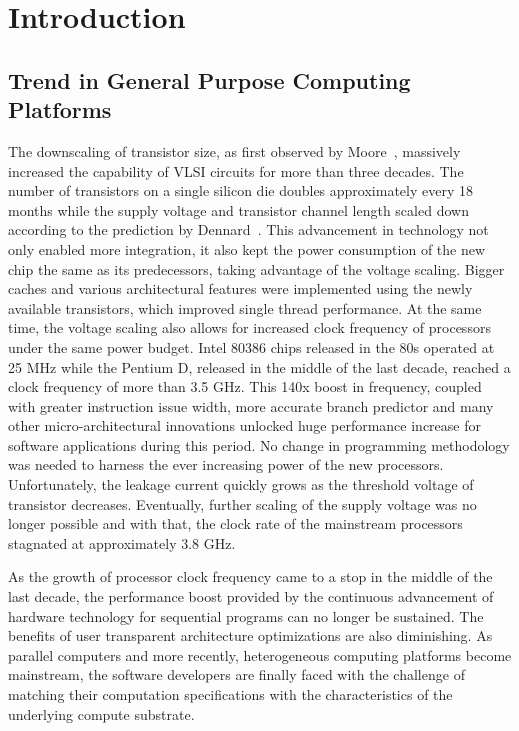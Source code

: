 \chapter{Introduction}
\label{chap1}
\section{Trend in General Purpose Computing Platforms}
The downscaling of transistor size, as first observed by Moore~\cite{Moore:2000:CMC:333067.333074}, massively increased the
capability of VLSI circuits for more than three decades. The number of transistors on a single silicon die doubles approximately every 18 months while the supply voltage and transistor channel length scaled down according to the prediction by Dennard~\cite{dennard1974design}. This advancement in technology not only
enabled more integration, it also kept the power consumption of the new chip the same as its predecessors, taking advantage of the voltage scaling. Bigger caches and
various architectural features were implemented using the newly available
transistors, which improved single thread performance. At the same time, the voltage scaling also allows for increased clock frequency of processors under the same power budget. Intel 80386 chips released in the 80s operated at 25 MHz while the Pentium D, released in the middle of the last decade, reached
a clock frequency of more than 3.5 GHz. This 140x boost in frequency, coupled with
greater instruction issue width, more accurate branch predictor and many other
micro-architectural innovations unlocked huge performance increase for
software applications during this period. No change in programming methodology
was needed to harness the ever increasing power of the new processors.  Unfortunately, the leakage current quickly grows as the threshold voltage of transistor decreases. Eventually,
further scaling of the supply voltage was no longer possible and with that, the clock rate of the mainstream processors stagnated at approximately 3.8 GHz. 


As the growth of processor clock frequency came to a stop in the middle of the last decade,
the performance boost provided by the continuous advancement of hardware technology for sequential programs
can no longer be sustained. The benefits of user transparent architecture optimizations are also 
diminishing. As parallel computers and more recently, heterogeneous computing platforms become mainstream,
the software developers are finally faced with the challenge of matching their computation specifications
with the characteristics of the underlying compute substrate. 


